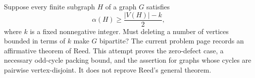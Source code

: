 Suppose every finite subgraph $H$ of a graph $G$ satisfies
\[
 \alpha(H)\geq\frac{|V(H)|-k}{2},
\]
where $k$ is a fixed nonnegative integer. Must deleting a number of
vertices bounded in terms of $k$ make $G$ bipartite?
The current problem page records an affirmative theorem of Reed.
This attempt proves the zero-defect case, a necessary odd-cycle
packing bound, and the assertion for graphs whose cycles are
pairwise vertex-disjoint. It does not reprove Reed's general theorem.
